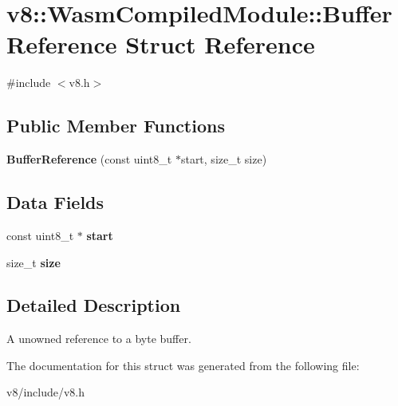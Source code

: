 \hypertarget{structv8_1_1WasmCompiledModule_1_1BufferReference}{}\section{v8\+:\+:Wasm\+Compiled\+Module\+:\+:Buffer\+Reference Struct Reference}
\label{structv8_1_1WasmCompiledModule_1_1BufferReference}


{\ttfamily \#include $<$v8.\+h$>$}

\subsection*{Public Member Functions}
\begin{DoxyCompactItemize}
\item 
\mbox{\label{structv8_1_1WasmCompiledModule_1_1BufferReference_ad46931134873606a9847ca2b5c464ec7}} 
{\bfseries Buffer\+Reference} (const uint8\+\_\+t $\ast$start, size\+\_\+t size)
\end{DoxyCompactItemize}
\subsection*{Data Fields}
\begin{DoxyCompactItemize}
\item 
\mbox{\label{structv8_1_1WasmCompiledModule_1_1BufferReference_a9ac4a0945b75f31d78b7b799571d1c62}} 
const uint8\+\_\+t $\ast$ {\bfseries start}
\item 
\mbox{\label{structv8_1_1WasmCompiledModule_1_1BufferReference_a8ea480c872a380496cd7f44c56f542cf}} 
size\+\_\+t {\bfseries size}
\end{DoxyCompactItemize}


\subsection{Detailed Description}
A unowned reference to a byte buffer. 

The documentation for this struct was generated from the following file\+:\begin{DoxyCompactItemize}
\item 
v8/include/v8.\+h\end{DoxyCompactItemize}

